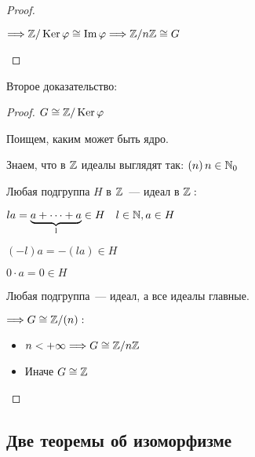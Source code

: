 \begin{theorem-non}
\begin{proof}
\begin{enumerate}
            $\Longrightarrow \mathbb{Z} / \operatorname{Ker} \varphi \cong \operatorname{Im} \varphi \Longrightarrow \mathbb{Z} / n \mathbb{Z} \cong G$
             
        \end{enumerate}
    \end{proof}

    Второе доказательство:
    \begin{proof}
        
        $G \cong \mathbb{Z} / \operatorname{Ker} \varphi$

        Поищем, каким может быть ядро.

        Знаем, что в $\mathbb{Z}$ идеалы выглядят так: $(n) \, n \in \mathbb{N}_{0}$

        Любая подгруппа $H$ в $\mathbb{Z}$~--- идеал в $\mathbb{Z}:$

        $la = \underbrace{a + \dots + a}_{\text{l}} \in H \quad l \in \mathbb{N}, a \in H$

        $(-l)a = -(la) \in H$

        $0 \cdot a = 0 \in H$

        Любая подгруппа~--- идеал, а все идеалы главные.

        $\Longrightarrow G \cong \mathbb{Z} / (n):$
        \begin{itemize}
            \item $n < +\infty \Longrightarrow G \cong \mathbb{Z} / n \mathbb{Z}$
            \item Иначе $G \cong \mathbb{Z}$
        \end{itemize}
    \end{proof}
\end{theorem-non}

\subsection{Две теоремы об изоморфизме}

